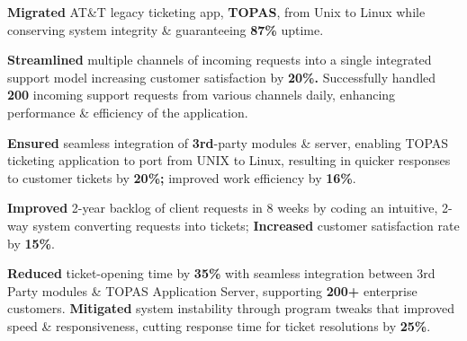 \documentclass[]{prakhar-resume-version-2}
\begin{document}
\begin{minipage}[t]{0.66\textwidth}
 \hspace{-4.5mm}
\vspace{-1.5mm}
\begin{itemize}
\justifying
\small{\item \textbf{Migrated} AT\&T legacy ticketing app, \textbf{TOPAS}, from Unix to Linux while conserving system integrity \& guaranteeing \textbf{87\%} uptime.
\vspace{-1.5mm} 
\item \textbf{Streamlined} multiple channels of incoming requests into a single integrated support model increasing customer satisfaction by \textbf{20\%.} Successfully handled \textbf{200} incoming support requests from various channels daily, enhancing performance \& efficiency of the application.
\vspace{-1.5mm} 
\item  \textbf{Ensured} seamless integration of \textbf{3rd}-party modules \& server, enabling TOPAS ticketing application to port from UNIX to Linux, resulting in quicker responses to customer tickets by \textbf{20\%;} improved work efficiency by \textbf{16\%}.
\vspace{-1.5mm} 
\item  \textbf{Improved} 2-year backlog of client requests in 8 weeks by coding an intuitive, 2-way system converting requests into tickets; \textbf{Increased} customer satisfaction rate by \textbf{15\%}.
\vspace{-1.5mm} 
\item \textbf{Reduced} ticket-opening time by \textbf{35\%} with seamless integration between 3rd Party modules \& TOPAS Application Server, supporting \textbf{200+} enterprise customers. \textbf{Mitigated} system instability through program tweaks that improved speed \& responsiveness, cutting response time for ticket resolutions by \textbf{25\%}.}
\end{itemize}
\sectionsep

\end{minipage} 
\end{document}
